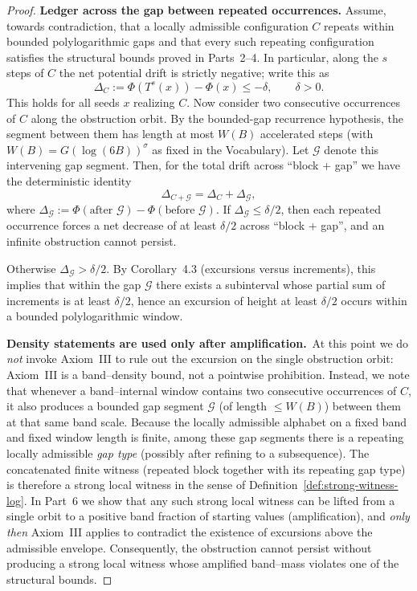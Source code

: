 \documentclass[preprint,12pt]{elsarticle}
\begin{document}
\begin{proof}
\smallskip
\noindent\textbf{Ledger across the gap between repeated occurrences.}
Assume, towards contradiction, that a locally admissible configuration $C$ repeats within
bounded polylogarithmic gaps and that every such repeating configuration satisfies the
structural bounds proved in Parts~2--4. In particular, along the $s$ steps of $C$ the net
potential drift is strictly negative; write this as
\[
\Delta_C:=\Phi(T^s(x))-\Phi(x)\le -\delta,\qquad \delta>0.
\]
This holds for all seeds $x$ realizing $C$.
Now consider two consecutive occurrences of $C$ along the obstruction orbit. By the bounded-gap
recurrence hypothesis, the segment between them has length at most $W(B)$ accelerated steps
(with $W(B)=G(\log(6B))^{\sigma}$ as fixed in the Vocabulary). Let $\mathcal{G}$ denote this intervening
gap segment. Then, for the total drift across ``block + gap'' we have the deterministic identity
\[
\Delta_{C+\mathcal G}=\Delta_C+\Delta_{\mathcal G},
\]
where \(\Delta_{\mathcal G}:=\Phi(\text{after }\mathcal{G})-\Phi(\text{before }\mathcal{G})\).
If $\Delta_\mathcal{G}\le \delta/2$, then each repeated occurrence forces a net decrease of at least
$\delta/2$ across ``block + gap'', and an infinite obstruction cannot persist.

Otherwise $\Delta_\mathcal{G}>\delta/2$. By Corollary~4.3 (excursions versus increments), this implies
that within the gap $\mathcal{G}$ there exists a subinterval whose partial sum of increments is at
least $\delta/2$, hence an excursion of height at least $\delta/2$ occurs within a bounded
polylogarithmic window.

\smallskip
\noindent\textbf{Density statements are used only after amplification.}\ 
At this point we do \emph{not} invoke Axiom~III to rule out the excursion on the single obstruction orbit: Axiom~III is a
band--density bound, not a pointwise prohibition.  Instead, we note that whenever a band--internal window contains two consecutive occurrences of $C$, it also
produces a bounded gap segment $\mathcal{G}$ (of length $\le W(B)$) between them at that same band scale.  Because the locally admissible alphabet on a fixed band and fixed window length is finite,
among these gap segments there is a repeating locally admissible \emph{gap type} (possibly after refining to a
subsequence).  The concatenated finite witness (repeated block together with its repeating gap type) is therefore
a strong local witness in the sense of Definition~\ref{def:strong-witness-log}.  In Part~6 we show that any such
strong local witness can be lifted from a single orbit to a positive band fraction of starting values (amplification),
and \emph{only then} Axiom~III applies to contradict the existence of excursions above the admissible envelope.
Consequently, the obstruction cannot persist without producing a strong local witness whose amplified band--mass
violates one of the structural bounds.



\end{proof}
\end{document}
